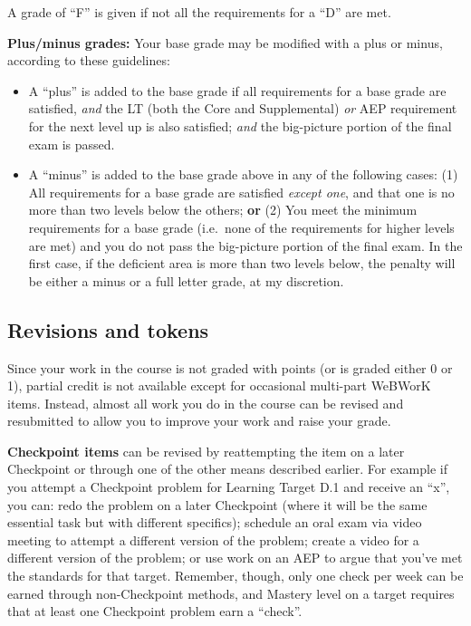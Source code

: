 \documentclass[]{article}
\providecommand{\tightlist}{%
  \setlength{\itemsep}{0pt}\setlength{\parskip}{0pt}}
\begin{document}
A grade of ``F'' is given if not all the requirements for a ``D'' are
met.

\textbf{Plus/minus grades:} Your base grade may be modified with a plus
or minus, according to these guidelines:

\begin{itemize}
\tightlist
\item
  A ``plus'' is added to the base grade if all requirements for a base
  grade are satisfied, \emph{and} the LT (both the Core and
  Supplemental) \emph{or} AEP requirement for the next level up is also
  satisfied; \emph{and} the big-picture portion of the final exam is
  passed.
\item
  A ``minus'' is added to the base grade above in any of the following
  cases: (1) All requirements for a base grade are satisfied
  \emph{except one}, and that one is no more than two levels below the
  others; \textbf{or} (2) You meet the minimum requirements for a base
  grade (i.e.~none of the requirements for higher levels are met) and
  you do not pass the big-picture portion of the final exam. In the
  first case, if the deficient area is more than two levels below, the
  penalty will be either a minus or a full letter grade, at my
  discretion.
\end{itemize}

\hypertarget{revisions-and-tokens}{%
\subsection{Revisions and tokens}\label{revisions-and-tokens}}

Since your work in the course is not graded with points (or is graded
either 0 or 1), partial credit is not available except for occasional
multi-part WeBWorK items. Instead, almost all work you do in the course
can be revised and resubmitted to allow you to improve your work and
raise your grade.

\textbf{Checkpoint items} can be revised by reattempting the item on a
later Checkpoint or through one of the other means described earlier.
For example if you attempt a Checkpoint problem for Learning Target D.1
and receive an ``x'', you can: redo the problem on a later Checkpoint
(where it will be the same essential task but with different specifics);
schedule an oral exam via video meeting to attempt a different version
of the problem; create a video for a different version of the problem;
or use work on an AEP to argue that you've met the standards for that
target. Remember, though, only one check per week can be earned through
non-Checkpoint methods, and Mastery level on a target requires that at
least one Checkpoint problem earn a ``check''.
\end{document}
